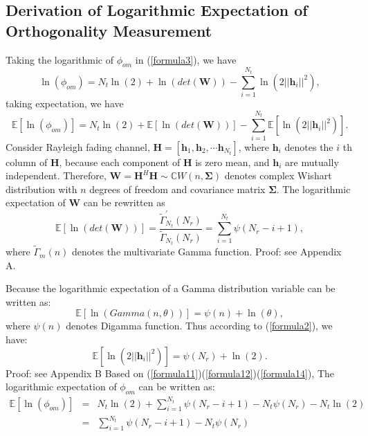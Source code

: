 \documentclass[12pt,letter,final]{article}
\begin{document}
\begin{spacing}{2.5}
\section{Derivation of Logarithmic Expectation of Orthogonality Measurement}
Taking the logarithmic of $\phi_{om}$ in (\ref{formula3}), we have 
\begin{equation}
\ln(\phi_{om})=N_{t}\ln(2)+\ln(det(\mathbf{W}))-\sum_{i=1}^{N_{t}}\ln(2||\mathbf{h}_{i}||^{2}),
\label{formula10}
\end{equation}
taking expectation, we have 
\begin{equation}
\mathbb{E}[\ln(\phi_{om})]=N_{t}\ln(2)+\mathbb{E}[\ln(det(\mathbf{W}))]-\sum_{i=1}^{N_{t}}\mathbb{E}[\ln(2||\mathbf{h}_{i}||^{2})].
\label{formula11}
\end{equation}
Consider Rayleigh fading channel, $\mathbf{H}=[\mathbf{h}_{1},\mathbf{h}_{2},\cdots \mathbf{h}_{N_{t}}]$, where $\mathbf{h}_{i}$ denotes the $i$ th column of $\mathbf{H}$, because each component of $\mathbf{H}$ is zero mean, and $\mathbf{h}_{i}$ are mutually independent. Therefore, $\mathbf{W}=\mathbf{H}^{H}\mathbf{H}\sim \mathbb{C}W(n, \mathbf{\Sigma})$ denotes complex Wishart distribution with $n$ degrees of freedom and covariance matrix $\mathbf{\Sigma}$. The logarithmic expectation of $\mathbf{W}$ can be rewritten as
\begin{equation}
\mathbb{E}[\ln(det(\mathbf{W}))]=\frac{\tilde{\Gamma}^{'}_{N_{t}}(N_{r})}{\tilde{\Gamma}_{N_{t}}(N_{r})}=\sum_{i=1}^{N_{t}}\psi(N_{r}-i+1),
\label{formula12}
\end{equation}
where $\tilde{\Gamma}_{m}(n)$ denotes the multivariate Gamma function. Proof: see Appendix A.

Because the logarithmic expectation of a Gamma distribution variable can be written as:
\begin{equation}
\mathbb{E}[\ln(Gamma(n,\theta))]=\psi(n)+\ln(\theta),
\end{equation}
where $\psi(n)$ denotes Digamma function. Thus according to (\ref{formula2}), we have:
\begin{equation}
\mathbb{E}[\ln(2||\mathbf{h}_{i}||^{2})]=\psi(N_{r})+\ln(2).
\label{formula14}
\end{equation}
Proof: see Appendix B
Based on (\ref{formula11})(\ref{formula12})(\ref{formula14}), The logarithmic expectation of $\phi_{om}$ can be written as:
\begin{eqnarray}
\nonumber
\mathbb{E}[\ln(\phi_{om})]&=&N_{t}\ln(2)+\sum_{i=1}^{N_{t}}\psi(N_{r}-i+1)-N_{t}\psi(N_{r})-N_{t}\ln(2)\\
&=& \sum_{i=1}^{N_{t}}\psi(N_{r}-i+1)-N_{t}\psi(N_{r})
\label{formula15}
\end{eqnarray}

\end{spacing}
\end{document}
